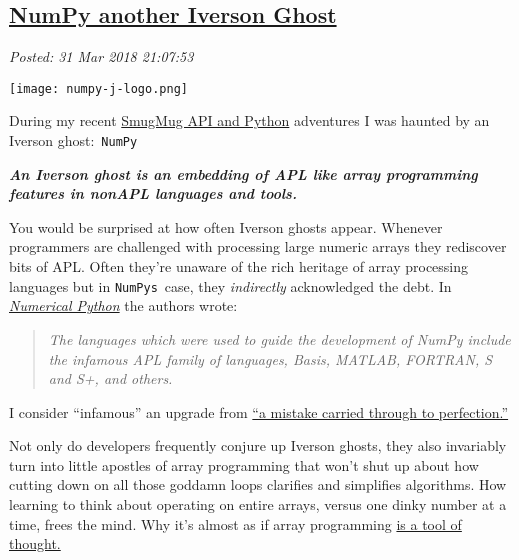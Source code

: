 %

\subsection*{\href{https://analyzethedatanotthedrivel.org/2018/03/31/numpy-another-iverson-ghost/}{NumPy another Iverson Ghost}}


\noindent\emph{Posted: 31 Mar 2018 21:07:53}
\vspace{6pt}


\captionsetup[floatingfigure]{labelformat=empty}
\begin{floatingfigure}[l]{0.23\textwidth}
\centering
\texttt{[image: numpy-j-logo.png]}
\label{fig:5565x0}
\end{floatingfigure}During
my recent \href{https://github.com/bakerjd99/smugpyter}{SmugMug API and
Python} adventures I was haunted by an Iverson ghost:~\texttt{NumPy}

\medskip

\emph{\textbf{An Iverson ghost is an embedding of APL like array
programming features in nonAPL languages and tools.}}

\medskip

You would be surprised at how often Iverson ghosts appear. Whenever
programmers are challenged with processing large numeric arrays they
rediscover bits of APL. Often they're unaware of the rich heritage of
array processing languages but in
\texttt{NumPy\textquotesingle{}s}~case, they \emph{indirectly}
acknowledged the debt. In
\href{http://numpy.sourceforge.net/numdoc/numdoc.pdf}{\emph{Numerical
Python}} the authors wrote:


\begin{quote}
\emph{The languages which were used to guide the development of NumPy
include the infamous APL family of languages, Basis, MATLAB, FORTRAN, S
and S+, and others.}
\end{quote}


I consider ``infamous'' an upgrade from
\href{http://www.cs.virginia.edu/~evans/cs655/readings/ewd498.html}{``a
mistake carried through to perfection.''}

Not only do developers frequently conjure up Iverson ghosts, they also
invariably turn into little apostles of array programming that won't
shut up about how cutting down on all those goddamn loops clarifies and
simplifies algorithms. How learning to think about operating on entire
arrays, versus one dinky number at a time, frees the mind. Why it's
almost as if array programming
\href{http://www.jsoftware.com/papers/tot.htm}{is a tool of thought.}

